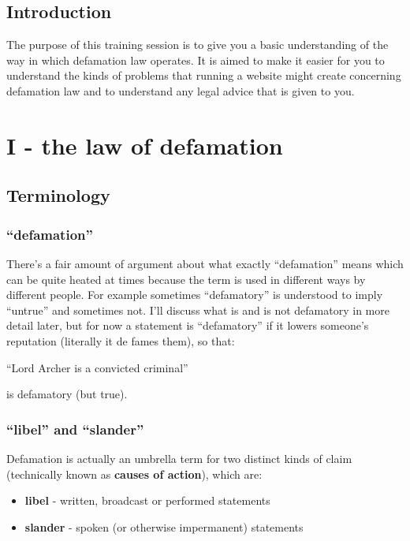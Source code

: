 \documentclass[]{article}
\date{}
\begin{document}
\subsection{Introduction}

The purpose of this training session is to give you a basic
understanding of the way in which defamation law operates. It is aimed
to make it easier for you to understand the kinds of problems that
running a website might create concerning defamation law and to
understand any legal advice that is given to you.

\section{I - the law of defamation}

\subsection{Terminology}

\subsubsection{\texorpdfstring{``defamation''}{defamation}}

There's a fair amount of argument about what exactly ``defamation''
means which can be quite heated at times because the term is used in
different ways by different people. For example sometimes ``defamatory''
is understood to imply ``untrue'' and sometimes not. I'll discuss what
is and is not defamatory in more detail later, but for now a statement
is ``defamatory'' if it lowers someone's reputation (literally it de
fames them), so that:

``Lord Archer is a convicted criminal''

is defamatory (but true).

\subsubsection{\texorpdfstring{``libel'' and
``slander''}{libel and slander}}

Defamation is actually an umbrella term for two distinct kinds of claim
(technically known as \textbf{causes of action}{), which are:}

\begin{itemize}
\item
  \textbf{libel}{ - written, broadcast or performed statements}
\item
  \textbf{slander}{ - spoken (or otherwise impermanent) statements}
\end{itemize}
\end{document}

